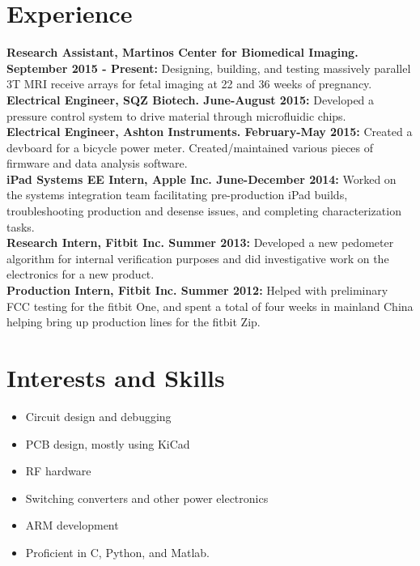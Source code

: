 \documentclass{res}
\begin{document}
\begin{resume}
\section{Experience}
	\vspace{0.05in}
	
	{\bf Research Assistant, Martinos Center for Biomedical Imaging. September 2015 - Present:} Designing, building, and testing massively parallel 3T MRI receive arrays for fetal imaging at 22 and 36 weeks of pregnancy. \vspace{0.05in}\\
	{\bf Electrical Engineer, SQZ Biotech. June-August 2015:} Developed a pressure control system to drive material through microfluidic chips. \vspace{0.05in}\\
	{\bf Electrical Engineer, Ashton Instruments. February-May 2015:} Created a devboard for a bicycle power meter.  Created/maintained various pieces of firmware and data analysis software. \vspace{0.05in}\\
	{\bf iPad Systems EE Intern, Apple Inc. June-December 2014:} Worked on the systems integration team facilitating pre-production iPad builds, troubleshooting production and desense issues, and completing characterization tasks.\vspace{0.05in}\\
	{\bf Research Intern, Fitbit Inc. Summer 2013:} Developed a new pedometer algorithm for internal verification purposes and did investigative work on the electronics for a new product.\vspace{0.05in}\\
	{\bf Production Intern, Fitbit Inc. Summer 2012:} Helped with preliminary FCC testing for the fitbit One, and spent a total of four weeks in mainland China helping bring up production lines for the fitbit Zip.\\
\section{Interests and Skills}
\begin{itemize}

  \item Circuit design and debugging
  \item PCB design, mostly using KiCad
  \item RF hardware
  \item Switching converters and other power electronics
  \item ARM development
  \item Proficient in C, Python, and Matlab.
\end{itemize}

\end{resume}
\end{document}
